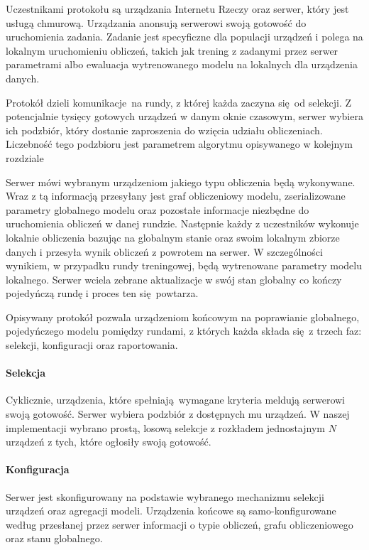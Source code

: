 Uczestnikami protokołu są urządzania Internetu Rzeczy oraz serwer, który jest usługą chmurową.
Urządzania anonsują serwerowi swoją gotowość do uruchomienia zadania. Zadanie jest specyficzne dla populacji urządzeń i polega na lokalnym uruchomieniu obliczeń, takich jak trening z zadanymi przez serwer parametrami albo ewaluacja wytrenowanego modelu na lokalnych dla urządzenia danych.

Protokół dzieli komunikacje na rundy, z której każda zaczyna się od selekcji. Z potencjalnie tysięcy gotowych urządzeń w danym oknie czasowym, serwer wybiera ich podzbiór, który dostanie zaproszenia do wzięcia udziału obliczeniach. Liczebność tego podzbioru jest parametrem algorytmu opisywanego w kolejnym rozdziale

Serwer mówi wybranym urządzeniom jakiego typu obliczenia będą wykonywane. Wraz z tą informacją
przesyłany jest graf obliczeniowy modelu, zserializowane parametry globalnego modelu oraz pozostałe
informacje niezbędne do uruchomienia obliczeń w danej rundzie. Następnie każdy z uczestników  wykonuje lokalnie obliczenia bazując na globalnym stanie oraz swoim lokalnym zbiorze danych i przesyła wynik obliczeń z powrotem na serwer. W szczególności wynikiem, w przypadku rundy treningowej, będą wytrenowane parametry modelu lokalnego. Serwer wciela zebrane aktualizacje w swój stan globalny co kończy pojedyńczą rundę i proces ten się powtarza.

Opisywany protokół pozwala urządzeniom końcowym na poprawianie globalnego, pojedyńczego modelu pomiędzy rundami, z których każda składa się z trzech faz: selekcji, konfiguracji oraz raportowania.

\paragraph{Selekcja}
Cyklicznie, urządzenia, które spełniają wymagane kryteria meldują serwerowi swoją gotowość. Serwer wybiera podzbiór z dostępnych mu urządzeń. W naszej implementacji wybrano prostą, losową selekcje  z rozkładem jednostajnym \(N\) urządzeń z tych, które
ogłosiły swoją gotowość. 


\paragraph{Konfiguracja}
Serwer jest skonfigurowany na podstawie wybranego mechanizmu selekcji urządzeń oraz agregacji
modeli. Urządzenia końcowe są samo-konfigurowane według przesłanej przez serwer informacji o typie obliczeń, grafu obliczeniowego oraz stanu globalnego.

